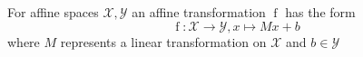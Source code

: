 For affine spaces $\mathcal{X}, \mathcal{Y}$ an affine transformation $\operatorname{f}$ has the form
$$\operatorname{f}: \mathcal{X} \to \mathcal{Y}, x \mapsto M x + b$$ 
where $M$ represents a linear transformation on $\mathcal{X}$ and $b \in \mathcal{Y}$
